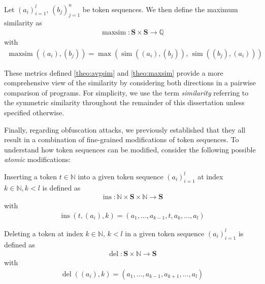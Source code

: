 \begin{theorem} \label{theo:maxsim}
    Let \((a_i)_{i=1}^l\), \((b_j)_{j=1}^n\) be token sequences.
    We then define the maximum similarity as
    \begin{align*}
    \operatorname{maxsim} : \mathbf{S} \times \mathbf{S} \rightarrow \mathbb{Q}
    \end{align*}
    with
    \begin{align*} 
     \operatorname{maxsim}((a_i), (b_j)) = \max(\operatorname{sim}((a_i), (b_j)),\, \operatorname{sim}((b_j), (a_i)))
\end{align*}

\end{theorem}

These metrics defined \autoref{theo:avgsim} and \autoref{theo:maxsim} provide a more comprehensive view of the similarity by considering both directions in a pairwise comparison of programs.
For simplicity, we use the term \textit{similarity} referring to the symmetric similarity throughout the remainder of this dissertation unless specified otherwise.

Finally, regarding obfuscation attacks, we previously established that they all result in a combination of fine-grained modifications of token sequences. To understand how token sequences can be modified, consider the following possible \textit{atomic} modifications:

\begin{theorem}
    Inserting a token \(t \in \mathbb{N}\) into a given token sequence \((a_i)_{i=1}^l\) at index \(k \in \mathbb{N}, k < l\) is defined as
    \begin{align*}
            \operatorname{ins} : \mathbb{N} \times \mathbf{S} \times \mathbb{N} \rightarrow \mathbf{S}
    \end{align*}
    with
    \begin{align*}
        \operatorname{ins}(t, (a_i), k) = (a_1, \dots, a_{k-1}, t, a_k, \dots, a_l)
    \end{align*}
\end{theorem}

\begin{theorem}
     Deleting a token at index \(k \in \mathbb{N},\, k < l\) in a given token sequence \((a_i)_{i=1}^l\) is defined as
    \begin{align*}
            \operatorname{del} : \mathbf{S} \times \mathbb{N} \rightarrow \mathbf{S}
    \end{align*}
    with
    \begin{align*}
        \operatorname{del}((a_i), k) = (a_1, \dots, a_{k-1}, a_{k+1}, \dots, a_l)
    \end{align*}
\end{theorem}

